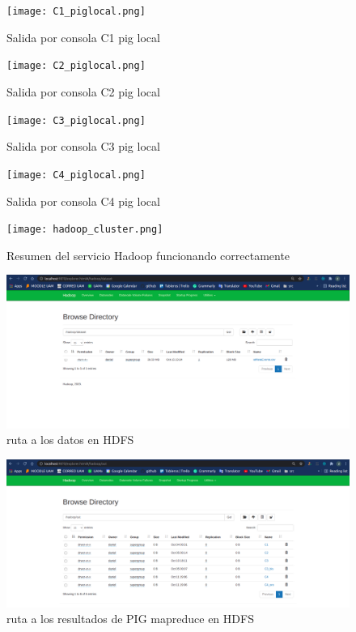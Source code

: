 \section*{}
\begin{figure}[hp!]
	\texttt{[image: C1\_piglocal.png]}
	\caption{Salida por consola C1 pig local}
	\label{fig:pig_C1_local}
\end{figure}
\begin{figure}[hp!]
	\texttt{[image: C2\_piglocal.png]}
	\caption{Salida por consola C2 pig local}
	\label{fig:pig_C2_local}
\end{figure}
\pagebreak
\begin{figure}[hp!]
	\texttt{[image: C3\_piglocal.png]}
	\caption{Salida por consola C3 pig local}
	\label{fig:pig_C3_local}
\end{figure}
\begin{figure}[hp!]
	\texttt{[image: C4\_piglocal.png]}
	\caption{Salida por consola C4 pig local}
	\label{fig:pig_C4_local}
\end{figure}
\pagebreak
\begin{figure}[hp!]
	\texttt{[image: hadoop\_cluster.png]}
\caption{Resumen del servicio Hadoop funcionando correctamente}
\label{fig:resumen_hadoop}
\end{figure}
\begin{figure}[hp!]
	\includegraphics[scale=0.25]{figures/hadoop_dataset.png}
	\caption{ruta a los datos en HDFS}
	\label{fig:datos_HDFS}
\end{figure}
\pagebreak
\begin{figure}[hp!]
	\includegraphics[scale=0.25]{figures/hadoop_out.png}
	\caption{ruta a los resultados de PIG mapreduce en HDFS}
	\label{fig:cruta_out_HDFS}
\end{figure}
